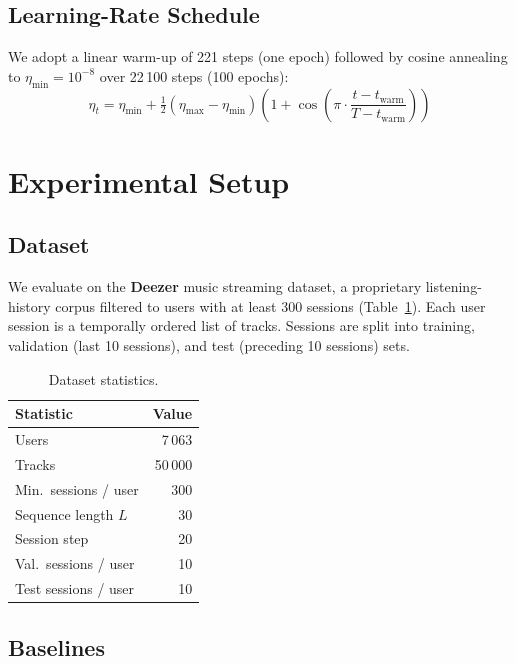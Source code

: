 \documentclass[conference]{IEEEtran}
\begin{document}
\subsection{Learning-Rate Schedule}
We adopt a linear warm-up of 221 steps (one epoch) followed by
cosine annealing to $\eta_{\min} = 10^{-8}$ over 22\,100 steps
(100 epochs):
%
\begin{equation}
\eta_t = \eta_{\min} + \tfrac{1}{2}(\eta_{\max} - \eta_{\min})
\left(1 + \cos\!\left(\pi \cdot \frac{t - t_{\text{warm}}}{T -
t_{\text{warm}}}\right)\right)
\end{equation}

\section{Experimental Setup}

\subsection{Dataset}
We evaluate on the \textbf{Deezer} music streaming dataset, a
proprietary listening-history corpus filtered to users with at
least 300 sessions (Table~\ref{tab:dataset}).
Each user session is a temporally ordered list of tracks.
Sessions are split into training, validation (last 10 sessions),
and test (preceding 10 sessions) sets.

\begin{table}[h]
\centering
\caption{Dataset statistics.}
\label{tab:dataset}
\begin{tabular}{lr}
\toprule
\textbf{Statistic} & \textbf{Value} \\
\midrule
Users & 7\,063 \\
Tracks & 50\,000 \\
Min.\ sessions / user & 300 \\
Sequence length $L$ & 30 \\
Session step & 20 \\
Val.\ sessions / user & 10 \\
Test sessions / user & 10 \\
\bottomrule
\end{tabular}
\end{table}

\subsection{Baselines}
\end{document}
